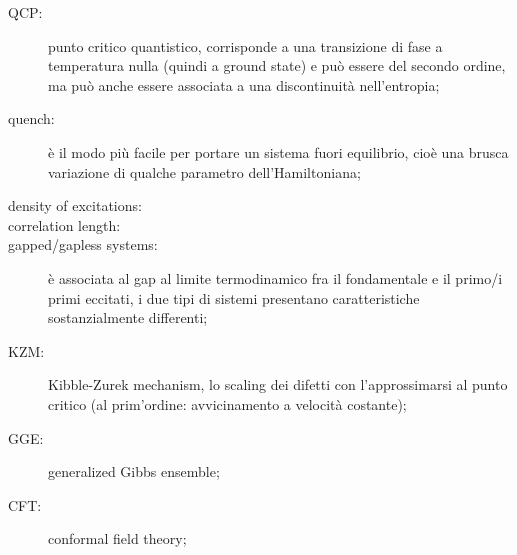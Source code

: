 \documentclass[a4paper,10pt]{article}
\begin{document}
\begin{description}
	\item[QCP:] punto critico quantistico, corrisponde a una transizione di fase a temperatura nulla (quindi a ground state) e può essere del secondo ordine, ma può anche essere associata a una discontinuità nell'entropia;
	\item[quench:] è il modo più facile per portare un sistema fuori equilibrio, cioè una brusca variazione di qualche parametro dell'Hamiltoniana;
	\item[density of excitations:]
	\item[correlation length:]
	\item[gapped/gapless systems:] è associata al gap al limite termodinamico fra il fondamentale e il primo/i primi eccitati, i due tipi di sistemi presentano caratteristiche sostanzialmente differenti;
	\item[KZM:] Kibble-Zurek mechanism, lo scaling dei difetti con l'approssimarsi al punto critico (al prim'ordine: avvicinamento a velocità costante);
	\item[GGE:] generalized Gibbs ensemble;
	\item[CFT:] conformal field theory;
\end{description}
\end{document}
